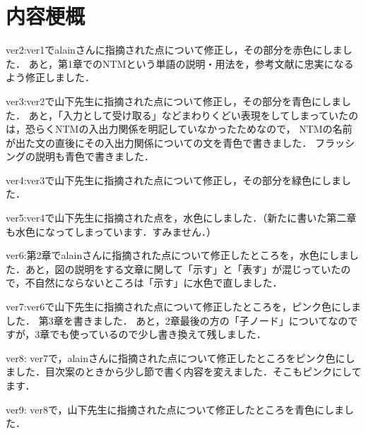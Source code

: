 \chapter*{内容梗概}
ver2:ver1でalainさんに指摘された点について修正し，その部分を赤色にしました．
あと，第1章でのNTMという単語の説明・用法を，参考文献に忠実になるよう修正しました．

ver3:ver2で山下先生に指摘された点について修正し，その部分を青色にしました．
あと，「入力として受け取る」などまわりくどい表現をしてしまっていたのは，恐らくNTMの入出力関係を明記していなかったためなので，
NTMの名前が出た文の直後にその入出力関係についての文を青色で書きました．
フラッシングの説明も青色で書きました．

ver4:ver3で山下先生に指摘された点について修正し，その部分を緑色にしました．

ver5:ver4で山下先生に指摘された点を，水色にしました．（新たに書いた第二章も水色になってしまっています．すみません．）

ver6:第2章でalainさんに指摘された点について修正したところを，水色にしました．あと，図の説明をする文章に関して「示す」と「表す」が混じっていたので，不自然にならないところは「示す」に水色で直しました．

ver7:ver6で山下先生に指摘された点について修正したところを，ピンク色にしました．
第3章を書きました．
あと，2章最後の方の「子ノード」についてなのですが，3章でも使っているので少し書き換えて残しました．

ver8:
ver7で，alainさんに指摘された点について修正したところをピンク色にしました．目次案のときから少し節で書く内容を変えました．そこもピンクにしてます．

ver9:
ver8で，山下先生に指摘された点について修正したところを青色にしました．
